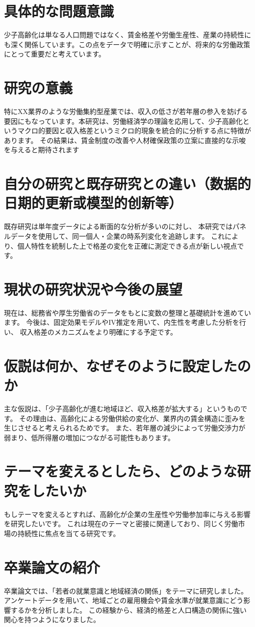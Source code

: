 \documentclass[xelatex,a4paper,base=11pt,ja=standard,jafont=noto]{bxjsreport}
\begin{document}
\section{具体的な問題意識}
少子高齢化は単なる人口問題ではなく、賃金格差や労働生産性、産業の持続性にも深く関係しています。この点をデータで明確に示すことが、将来的な労働政策にとって重要だと考えています。
\section{研究の意義}
特にXX業界のような労働集約型産業では、収入の低さが若年層の参入を妨げる要因にもなっています。本研究は、労働経済学の理論を応用して、少子高齢化というマクロ的要因と収入格差というミクロ的現象を統合的に分析する点に特徴があります。
その結果は、賃金制度の改善や人材確保政策の立案に直接的な示唆を与えると期待されます
\section{自分の研究と既存研究との違い（数据的日期的更新或模型的创新等）}
既存研究は単年度データによる断面的な分析が多いのに対し、
本研究ではパネルデータを使用して、同一個人・企業の時系列変化を追跡します。
これにより、個人特性を統制した上で格差の変化を正確に測定できる点が新しい視点です。
\section{現状の研究状況や今後の展望}
現在は、総務省や厚生労働省のデータをもとに変数の整理と基礎統計を進めています。
今後は、固定効果モデルやIV推定を用いて、内生性を考慮した分析を行い、
収入格差のメカニズムをより明確にする予定です。
\section{仮説は何か、なぜそのように設定したのか}
主な仮説は、「少子高齢化が進む地域ほど、収入格差が拡大する」というものです。
その理由は、高齢化による労働供給の変化が、業界内の賃金構造に歪みを生じさせると考えられるためです。
また、若年層の減少によって労働交渉力が弱まり、低所得層の増加につながる可能性もあります。
\section{テーマを変えるとしたら、どのような研究をしたいか}
もしテーマを変えるとすれば、高齢化が企業の生産性や労働参加率に与える影響を研究したいです。
これは現在のテーマと密接に関連しており、同じく労働市場の持続性に焦点を当てる研究です。
\section{卒業論文の紹介}
卒業論文では、「若者の就業意識と地域経済の関係」をテーマに研究しました。
アンケートデータを用いて、地域ごとの雇用機会や賃金水準が就業意識にどう影響するかを分析しました。
この経験から、経済的格差と人口構造の関係に強い関心を持つようになりました。
\end{document}
